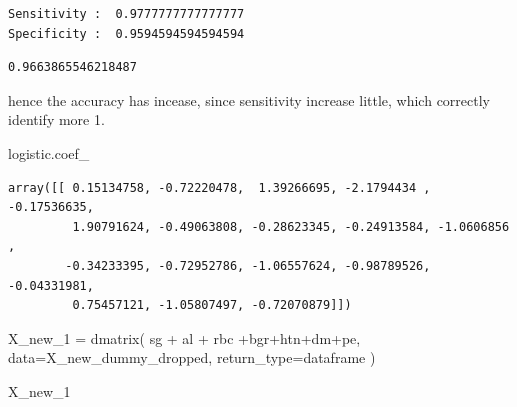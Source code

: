 \documentclass[
  11pt,
  letterpaper,
  DIV=11,
  numbers=noendperiod]{scrartcl}
\newenvironment{Shaded}{\begin{snugshade}}{\end{snugshade}}
\newcommand{\NormalTok}[1]{\textcolor[rgb]{0.00,0.23,0.31}{#1}}
\newcommand{\OperatorTok}[1]{\textcolor[rgb]{0.37,0.37,0.37}{#1}}
\newcommand{\StringTok}[1]{\textcolor[rgb]{0.13,0.47,0.30}{#1}}
\begin{document}
\begin{verbatim}
Sensitivity :  0.9777777777777777
Specificity :  0.9594594594594594
\end{verbatim}

\begin{verbatim}
0.9663865546218487
\end{verbatim}

hence the accuracy has incease, since sensitivity increase little, which
correctly identify more 1.

\begin{Shaded}
\begin{Highlighting}[]
\NormalTok{logistic.coef\_}
\end{Highlighting}
\end{Shaded}

\begin{verbatim}
array([[ 0.15134758, -0.72220478,  1.39266695, -2.1794434 , -0.17536635,
         1.90791624, -0.49063808, -0.28623345, -0.24913584, -1.0606856 ,
        -0.34233395, -0.72952786, -1.06557624, -0.98789526, -0.04331981,
         0.75457121, -1.05807497, -0.72070879]])
\end{verbatim}

\begin{Shaded}
\begin{Highlighting}[]
\NormalTok{X\_new\_1 }\OperatorTok{=}\NormalTok{ dmatrix(}
\StringTok{\textquotesingle{}sg + al + rbc +bgr+htn+dm+pe\textquotesingle{}}\NormalTok{,}
\NormalTok{data}\OperatorTok{=}\NormalTok{X\_new\_dummy\_dropped,}
\NormalTok{return\_type}\OperatorTok{=}\StringTok{\textquotesingle{}dataframe\textquotesingle{}}
\NormalTok{)}

\NormalTok{X\_new\_1}
\end{Highlighting}
\end{Shaded}
\end{document}
